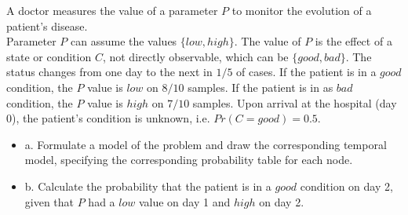 \Exercise[number={5}]
A doctor measures the value of a parameter \(P\) to monitor the evolution
of a patient's disease.\\
Parameter \(P\) can assume the values \(\{low, high\}\). The value of \(P\)
is the effect of a state or condition \(C\), not directly observable,
which can be \(\{good, bad\}\).
The status changes from one day to the next in \(1/5\) of cases. If the
patient is in a \(good\) condition, the \(P\) value is \(low\) on \(8/10\)
samples. If the patient is in as \(bad\) condition, the \(P\) value is
\(high\) on \(7/10\) samples. Upon arrival at the hospital (day 0), the
patient's condition is unknown, i.e. \(Pr(C=good)=0.5\).
\begin{itemize}
    \item\quad a. Formulate a model of the problem and draw the
    corresponding temporal model, specifying the corresponding probability
    table for each node.
    \item\quad b. Calculate the probability that the patient is in a
    \(good\) condition on day 2, given that \(P\) had a \(low\) value on
    day 1 and \(high\) on day 2.
\end{itemize}


